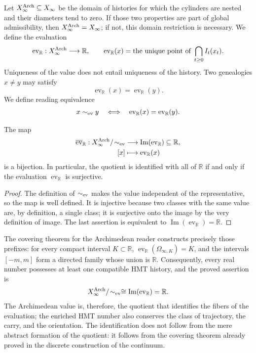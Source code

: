 Let \(X_\infty^{\rm Arch}\subseteq X_\infty\) be the domain of histories for
which the cylinders are nested and their diameters tend to zero. If those
two properties are part of global admissibility, then
\(X_\infty^{\rm Arch}=X_\infty\); if not, this domain restriction is
necessary. We define the evaluation
\[
\operatorname{ev}_{\mathbb R}:X_\infty^{\rm Arch}\longrightarrow\mathbb R,
\qquad
\operatorname{ev}_{\mathbb R}(x)=
\text{the unique point of }\bigcap_{t\ge0}I_t(x_t).
\]
Uniqueness of the value does not entail uniqueness of the history. Two
genealogies \(x\ne y\) may satisfy
\[
\operatorname{ev}_{\mathbb R}(x)
=\operatorname{ev}_{\mathbb R}(y).
\]
We define reading equivalence
\[
x\sim_{\rm ev}y
\quad\Longleftrightarrow\quad
\operatorname{ev}_{\mathbb R}(x)
=\operatorname{ev}_{\mathbb R}(y).
\]

\begin{theorem}
The map
\[
\begin{aligned}
\overline{\operatorname{ev}}_{\mathbb R}:
X_\infty^{\rm Arch}/\!\sim_{\rm ev}
&\longrightarrow
\operatorname{Im}(\operatorname{ev}_{\mathbb R})\subseteq\mathbb R,\\
[x]&\longmapsto\operatorname{ev}_{\mathbb R}(x)
\end{aligned}
\]
is a bijection. In particular, the quotient is identified with all of
\(\mathbb R\) if and only if the evaluation
\(\operatorname{ev}_{\mathbb R}\) is surjective.
\end{theorem}

\begin{proof}
The definition of \(\sim_{\rm ev}\) makes the value independent of the
representative, so the map is well defined. It is injective because
two classes with the same value are, by definition, a single class; it is
surjective onto the image by the very definition of image. The last
assertion is equivalent to
\(\operatorname{Im}(\operatorname{ev}_{\mathbb R})=\mathbb R\).
\end{proof}

The covering theorem for the Archimedean reader constructs precisely those
prefixes: for every compact interval \(K\subset\mathbb R\),
\(\operatorname{ev}_{\mathbb R}(\Omega_{\infty,K})=K\), and the intervals
\([-m,m]\) form a directed family whose union is \(\mathbb R\).
Consequently, every real number possesses at least one compatible HMT history, and the
proved assertion is
\[
X_\infty^{\rm Arch}/\!\sim_{\rm ev}
\cong\operatorname{Im}(\operatorname{ev}_{\mathbb R})
=\mathbb R.
\]
The Archimedean value is, therefore, the quotient that identifies the fibers of
the evaluation; the enriched HMT number also conserves the class of
trajectory, the carry, and the orientation. The identification does not follow from the
mere abstract formation of the quotient: it follows from the covering theorem already
proved in the discrete construction of the continuum.

